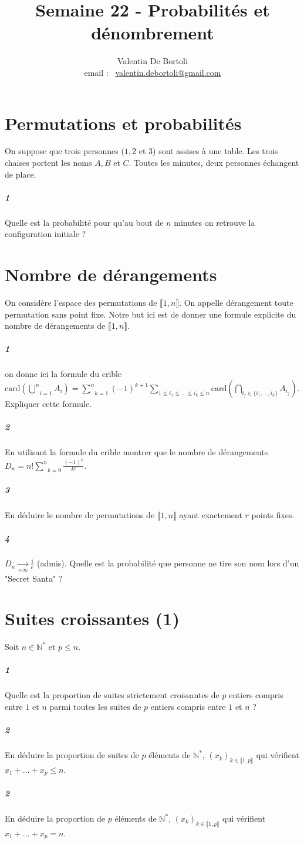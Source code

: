 \documentclass[10pt,a4paper]{article}
\title{Semaine 22 - Probabilités et dénombrement}
\author{Valentin De Bortoli \\ email : \ \href{mailto:valentin.debortoli@gmail.com}{valentin.debortoli@gmail.com}}
\date{}
\begin{document}
\maketitle
\section{Permutations et probabilités}
On suppose que trois personnes ($1,2$ et $3$) sont assises à une table. Les trois chaises portent les noms $A,B$ et $C$. Toutes les minutes, deux personnes échangent de place.
\subparagraph{1}Quelle est la probabilité pour qu'au bout de $n$ minutes on retrouve la configuration initiale ?

\section{Nombre de dérangements}
On considère l'espace des permutations de $\llbracket 1,n \rrbracket$. On appelle dérangement toute permutation sans point fixe. Notre but ici est de donner une formule explicite du nombre de dérangements de $\llbracket 1,n \rrbracket$.
\subparagraph{1} on donne ici la formule du crible $\text{card} \left( \underset{i=1}{\overset{n}{\bigcup}} A_i \right) = \underset{k=1}{\overset{n}{\sum}}(-1)^{k+1} \underset{1\le i_1 \le \dots \le i_k \le n}{\sum} \text{card} \left( \underset{i_j  \in \lbrace i_1,\dots,i_k \rbrace }{\bigcap} A_{i_j} \right)$. Expliquer cette formule.
\subparagraph{2}En utilisant la formule du crible montrer que le nombre de dérangements $D_n = n! \underset{k=0}{\overset{n}{\sum}} \frac{(-1)^k}{k!}$.
\subparagraph{3}En déduire le nombre de permutations de $\llbracket 1,n \rrbracket$ ayant exactement $r$ points fixes.
\subparagraph{4}$D_n \underset{+\infty}{\rightarrow} \frac{1}{e}$ (admis). Quelle est la probabilité que personne ne tire son nom lors d'un "Secret Santa" ?


\section{Suites croissantes (1)}
Soit $n \in \mathbb{N}^*$ et $p \le n$.
\subparagraph{1}Quelle est la proportion de suites strictement croissantes de $p$ entiers compris entre $1$ et $n$ parmi toutes les suites de $p$ entiers compris entre $1$ et $n$ ?
\subparagraph{2}En déduire la proportion de suites de $p$ éléments de $\mathbb{N}^*$, $(x_k)_{k \in \llbracket 1,p \rrbracket}$ qui vérifient $x_1 + \dots + x_p \le n$.
\subparagraph{2}En déduire la proportion de $p$ éléments de $\mathbb{N}^*$, $(x_k)_{k \in \llbracket 1,p \rrbracket}$ qui vérifient $x_1 + \dots + x_p = n$.
\end{document}
